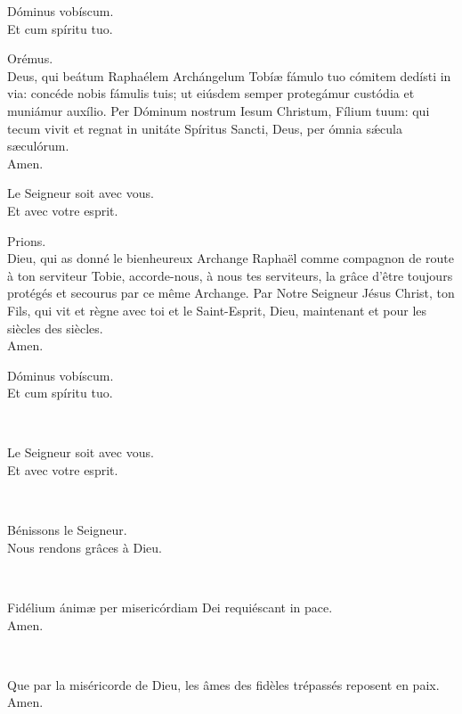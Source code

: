 \documentclass[twoside]{article}
\begin{document}
\begin{paracol}[1]{2}
\vv Dóminus vobíscum. \\
\rr Et cum spíritu tuo.

Orémus.\\
Deus, qui beátum Raphaélem Archángelum Tobíæ fámulo tuo cómitem dedísti in via: concéde nobis fámulis tuis; ut eiúsdem semper protegámur custódia et muniámur auxílio.
Per Dóminum nostrum Iesum Christum, Fílium tuum: qui tecum vivit et regnat in unitáte Spíritus Sancti, Deus, per ómnia sǽcula sæculórum. \\
\rr Amen.

\switchcolumn

\vv Le Seigneur soit avec vous. \\
\rr Et avec votre esprit.

Prions. \\
Dieu, qui as donné le bienheureux Archange Raphaël comme compagnon de route à ton serviteur Tobie, accorde-nous, à nous tes serviteurs, la grâce d’être toujours protégés et secourus par ce même Archange.
Par Notre Seigneur Jésus Christ, ton Fils, qui vit et règne avec toi et le Saint-Esprit, Dieu, maintenant et pour les siècles des siècles.\\
\rr Amen.

\switchcolumn*

\vv Dóminus vobíscum. \\
\rr Et cum spíritu tuo.

~~


\switchcolumn

\vv Le Seigneur soit avec vous. \\
\rr Et avec votre esprit.

~~

\vv Bénissons le Seigneur. \\
\rr Nous rendons grâces à Dieu.

\switchcolumn*

~~

\vv Fidélium ánimæ per misericórdiam Dei requiéscant in pace. \\
\rr Amen.

\switchcolumn

~~

\vv Que par la miséricorde de Dieu, les âmes des fidèles trépassés reposent en paix. \\
\rr Amen.

\end{paracol}
\end{document}
